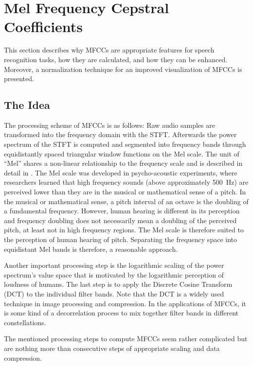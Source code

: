 
\section{Mel Frequency Cepstral Coefficients}\label{sec:signal_mfcc}
This section describes why MFCCs are appropriate features for speech recognition tasks, how they are calculated, and how they can be enhanced.
Moreover, a normalization technique for an improved visualization of MFCCs is presented.



\subsection{The Idea}
The processing scheme of MFCCs \cite{Mermelstein1980} is as follows:
Raw audio samples are transformed into the frequency domain with the STFT.
Afterwards the power spectrum of the STFT is computed and segmented into frequency bands through equidistantly spaced triangular window functions on the Mel scale.
The unit of \enquote{Mel} shares a non-linear relationship to the frequency scale and is described in detail in .
The Mel scale was developed in psycho-acoustic experiments, where researchers learned that high frequency sounds (above approximately \SI{500}{\hertz}) are perceived lower than they are in the musical or mathematical sense of a pitch.
In the musical or mathematical sense, a pitch interval of an octave is the doubling of a fundamental frequency.
However, human hearing is different in its perception and frequency doubling does not necessarily mean a doubling of the perceived pitch, at least not in high frequency regions.
The Mel scale is therefore suited to the perception of human hearing of pitch.
Separating the frequency space into equidistant Mel bands is therefore, a reasonable approach.

Another important processing step is the logarithmic scaling of the power spectrum's value space that is motivated by the logarithmic perception of loudness of humans.
The last step is to apply the Discrete Cosine Transform (DCT) to the individual filter bands.
Note that the DCT is a widely used technique in image processing and compression.
In the applications of MFCCs, it is some kind of a decorrelation process to mix together filter bands in different constellations.

The mentioned processing steps to compute MFCCs seem rather complicated but are nothing more than consecutive steps of appropriate scaling and data compression.


